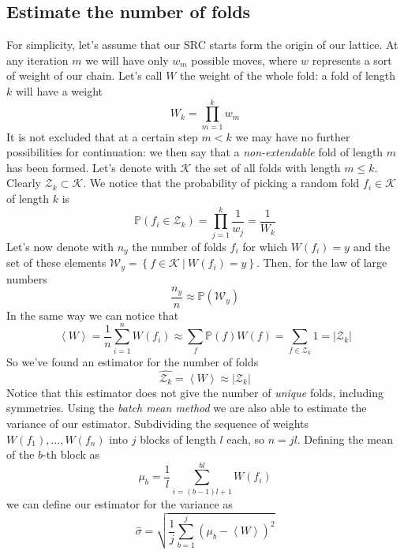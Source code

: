 \subsection{Estimate the number of folds}
For simplicity, let's assume that our SRC starts form the origin of our lattice.
At any iteration $m$ we will have only $w_m$ possible moves, where $w$ represents a sort of weight of our chain.
Let's call $W$ the weight of the whole fold: a fold of length $k$ will have a weight
\begin{equation*}
    W_k = \prod_{m=1}^k w_m
\end{equation*}
It is not excluded that at a certain step $m < k$ we may have no further possibilities for continuation: we then say that a \emph{non-extendable} fold of length $m$ has been formed.
Let's denote with $\mathcal{K}$ the set of all folds with length $m \leq k$.
Clearly $\mathcal{Z}_k \subset \mathcal{K}$.
We notice that the probability of picking a random fold $f_i \in \mathcal{K}$ of length $k$ is
\begin{equation*}
    \mathbb{P}\left(f_i \in \mathcal{Z}_k\right) = \prod_{j=1}^k \frac{1}{w_j} = \frac{1}{W_k}
\end{equation*}
Let's now denote with $n_y$ the number of folds $f_i$ for which $W\left(f_i\right) = y$ and the set of these elements $\mathcal{W}_y = \left\{f \in \mathcal{K} \ | \ W\left(f_i\right) = y\right\}$.
Then, for the law of large numbers
\begin{equation*}
    \frac{n_y}{n} \approx \mathbb{P}\left(\mathcal{W}_y\right)
\end{equation*}
In the same way we can notice that
\begin{equation*}
    \left\langle W \right\rangle = \frac{1}{n} \sum_{i=1}^n W\left(f_i\right) \approx \sum_f \mathbb{P}\left(f\right)W\left(f\right) = \sum_{f \in \mathcal{Z}_k} 1 = \left\lvert \mathcal{Z}_k \right\rvert
\end{equation*}
So we've found an estimator for the number of folds
\begin{equation*}
    \hat{\mathcal{Z}_k} = \left\langle W \right\rangle \approx \left\lvert \mathcal{Z}_k \right\rvert
\end{equation*}
Notice that this estimator does not give the number of \emph{unique} folds, including symmetries.
Using the \emph{batch mean method} we are also able to estimate the variance of our estimator.
Subdividing the sequence of weights $W\left(f_1\right),\ldots,W\left(f_n\right)$ into $j$ blocks of length $l$ each, so $n = jl$.
Defining the mean of the $b$-th block as
\begin{equation*}
    \mu_b = \frac{1}{l} \sum_{i = (b-1)l + 1}^{bl} W\left(f_i\right)
\end{equation*}
we can define our estimator for the variance as
\begin{equation*}
    \hat{\sigma} = \sqrt{\frac{1}{j} \sum_{b = 1}^j \left(\mu_b - \left\langle W \right\rangle\right)^2}
\end{equation*}